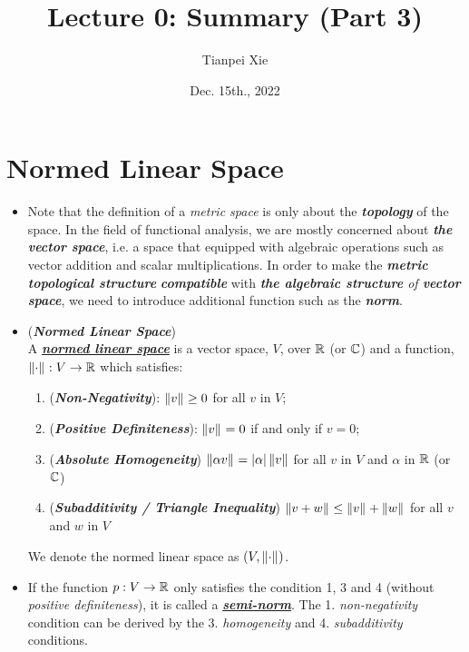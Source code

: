 \documentclass[11pt]{article}
\begin{document}
\title{Lecture 0: Summary (Part 3)}
\author{ Tianpei Xie}
\date{ Dec. 15th., 2022 }
\maketitle
\tableofcontents
\newpage
\section{Normed Linear Space}
\begin{itemize}
\item \begin{remark}
Note that the definition of a \emph{metric space} is only about the \emph{\textbf{topology}} of the space. In the field of functional analysis,  we are mostly concerned about \emph{\textbf{the vector space}}, i.e. a space that equipped with algebraic operations such as vector addition and  scalar multiplications. In order to make the \emph{\textbf{metric}\textbf{ topological structure}} \emph{\textbf{compatible}} with \emph{\textbf{the algebraic structure} of \textbf{vector space}}, we need to introduce additional function such as the \emph{\textbf{norm}}.
\end{remark}

\item \begin{definition} (\emph{\textbf{Normed Linear Space}})\\
A \underline{\emph{\textbf{normed linear space}}} is a vector space, $V$, over ${\mathbb R}$ (or ${\mathbb C}$) and a function, $\left\|\cdot\right\|_{}: V \rightarrow {\mathbb R}$ which satisfies:
\begin{enumerate}
\item (\emph{\textbf{Non-Negativity}}): $\left\|v\right\|_{} \ge 0$ for all $v$ in $V$;
\item (\emph{\textbf{Positive Definiteness}}): $\left\|v\right\|_{} = 0$ if and only if $v = 0$;
\item (\emph{\textbf{Absolute Homogeneity}}) $\left\|\alpha v\right\|_{} = \left\lvert \alpha \right\rvert\left\|v\right\|_{}$ for all $v$ in $V$ and $\alpha$ in ${\mathbb R}$ (or ${\mathbb C}$)
\item (\emph{\textbf{Subadditivity / Triangle Inequality}}) $\left\|v + w\right\|_{}\le \left\|v\right\|_{} + \left\|w\right\|_{}$ for all $v$ and $w$ in $V$
\end{enumerate}
We denote the normed linear space as $(V, \left\|\cdot\right\|_{})$.
\end{definition}

\item \begin{remark}
If the function $p: V \rightarrow {\mathbb R}$ only satisfies the condition 1, 3 and 4 (without \emph{positive definiteness}), it is called a \underline{\emph{\textbf{semi-norm}}}. The 1. \emph{non-negativity} condition can be derived by the 3. \emph{homogeneity} and 4. \emph{subadditivity} conditions. 
\end{remark}


\end{itemize}
\end{document}
